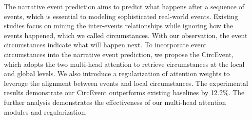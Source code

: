 The narrative event prediction aims to predict what happens after a sequence of events, which is essential to modeling sophisticated real-world events. Existing studies focus on mining the inter-events relationships while ignoring how the events happened, which we called circumstances. With our observation, the event circumstances indicate what will happen next. To incorporate event circumstances into the narrative event prediction, we propose the CircEvent, which adopts the two multi-head attention to retrieve circumstances at the local and global levels. We also introduce a regularization of attention weights to leverage the alignment between events and local circumstances. The experimental results demonstrate our CircEvent outperforms existing baselines by 12.2\%. The further analysis demonstrates the effectiveness of our multi-head attention modules and regularization.
